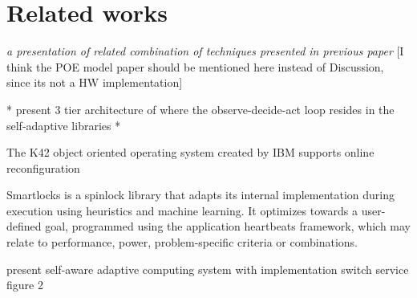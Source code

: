 
\section{Related works}
\label{sec:related}

\emph{a presentation of related combination of techniques presented in previous paper}
[I think the POE model paper should be mentioned here instead of Discussion, since its not a HW implementation]


* present 3 tier architecture of \cite{evolvable} where the observe-decide-act loop resides in the self-adaptive libraries *

The K42 object oriented operating system created by IBM supports online reconfiguration \cite{evolvable}

Smartlocks is a spinlock library that adapts its internal implementation during execution using heuristics and machine learning. It optimizes towards a user-defined goal, programmed using the application heartbeats framework, which may relate to performance, power, problem-specific criteria or combinations. \cite{reconfigurable}

present self-aware adaptive computing system with implementation switch service figure 2